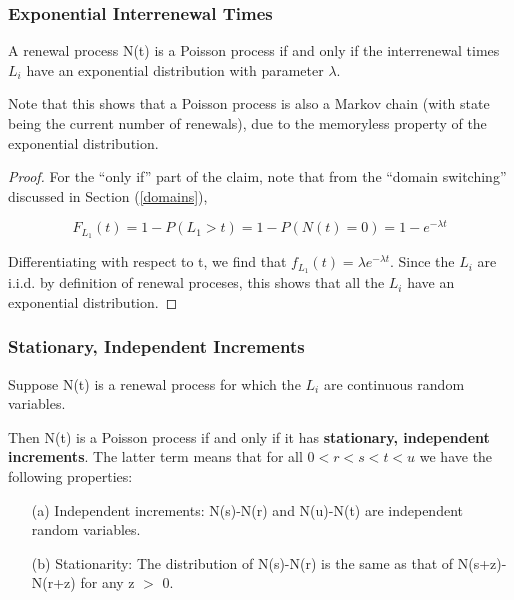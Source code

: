 \subsubsection{Exponential Interrenewal Times}

\begin{theorem}

A renewal process N(t) is a Poisson process if and only if the
interrenewal times $L_{i}$ have an exponential distribution with
parameter $\lambda $.  

Note that this shows that a Poisson process is also a Markov chain (with
state being the current number of renewals), due to the memoryless
property of the exponential distribution.

\end{theorem}

\begin{proof}

For the ``only if'' part of the claim, note that from the ``domain
switching'' discussed in Section (\ref{domains}), 

\begin{equation}
F_{L_{1}}(t)=1-P(L_{1}>t)=1-P(N(t)=0)=1-e^{-\lambda t}
\end{equation}

Differentiating with respect to t, we find that $f_{L_{1}}(t)=\lambda
e^{-\lambda t}$.  Since the $L_i$ are i.i.d. by definition of renewal
proceses, this shows that all the $L_i$ have an exponential
distribution.

\end{proof}

\subsubsection{Stationary, Independent Increments}

\begin{theorem}

Suppose N(t) is a renewal process for which the $L_i$ are
continuous random variables.

Then N(t) is a Poisson process if and only if it has \textbf{stationary,
independent increments}.  The latter term means that for all 
$0<r<s<t<u$ we have the following properties: 

\begin{itemize}

\item [(a)] Independent increments:  N(s)-N(r) and N(u)-N(t) are
independent random variables.

\item [(b)] Stationarity:  The distribution of N(s)-N(r) is the same as
that of N(s+z)-N(r+z) for any z $>$ 0.

\end{itemize}

\end{theorem}

